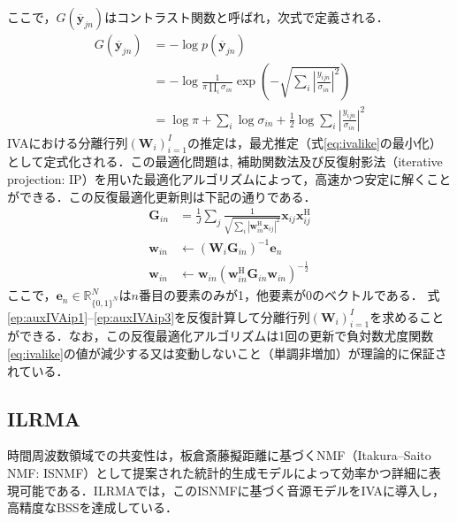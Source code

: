 \documentclass[10.5pt]{jarticle}
\begin{document}
ここで，$G(\overline{\bm{y}}_{jn})$はコントラスト関数と呼ばれ，次式で定義される．
\begin{align}
  \nonumber G(\overline{\bm{y}}_{jn}) &= -\log p(\overline{\bm{y}}_{jn}) \\
  \nonumber  &= -\log \frac{1}{\pi \prod_{i} \sigma_{in}} \exp \left(  - \sqrt{ \sum_i \left| \frac{y_{ijn}}{\sigma_{in}} \right|^2}  \right) \\
  &= \log \pi + \sum_i \log \sigma_{in} + \frac{1}{2} \log \sum_i \left| \frac{y_{ijn}}{\sigma_{in}}\right|^2
\end{align}
IVAにおける分離行列$( \bm{W}_i )_{i=1}^I$の推定は，最尤推定（式\eqref{eq:ivalike}の最小化）として定式化される．この最適化問題は, 補助関数法\cite{auxfunc}{及び反復射影法（iterative projection: IP）\cite{auxIVA}を用いた最適化アルゴリズムによって，高速かつ安定に解くことができる\cite{stable_auxIVA}．この反復最適化更新則は下記の通りである．}
\begin{align}
\bm{G}_{in} &= \frac{1}{J} \sum_j \frac{1}{\sqrt{\sum_{i} |\bm{w}_{in}^\mathrm{H}\bm{x}_{ij}|^{2}}} \bm{x}_{ij} \bm{x}_{ij}^{\mathrm{H}} \label{ep:auxIVAip1} \\
\bm{w}_{in} &\leftarrow (\bm{W}_i \bm{G}_{in})^{-1} \bm{e}_n \label{ep:auxIVAip2} \\
\bm{w}_{in} &\leftarrow \bm{w}_{in} ( \bm{w}_{in}^{\mathrm{H}} \bm{G}_{in} \bm{w}_{in} )^{-\frac{1}{2}} \label{ep:auxIVAip3}
\end{align}
ここで，$\bm{e}_{n} \in \mathbb{R}^{N}_{\{ 0, 1 \}^N}$は$n$番目の要素のみが1，他要素が0のベクトルである．
{式\eqref{ep:auxIVAip1}--\eqref{ep:auxIVAip3}を反復計算して分離行列$( \bm{W}_i )_{i=1}^I$を求めることができる．なお，この反復最適化アルゴリズムは1回の更新で負対数尤度関数\eqref{eq:ivalike}の値が減少する又は変動しないこと（単調非増加）が理論的に保証されている．}

\subsection{ILRMA}

\hspace{1.0em}時間周波数領域での共変性は，板倉斎藤擬距離に基づくNMF（Itakura--Saito NMF: ISNMF）\cite{isnmf}として提案された統計的生成モデルによって効率かつ詳細に表現可能である．ILRMAでは，このISNMFに基づく音源モデルをIVAに導入し，高精度なBSSを達成している．
\end{document}
